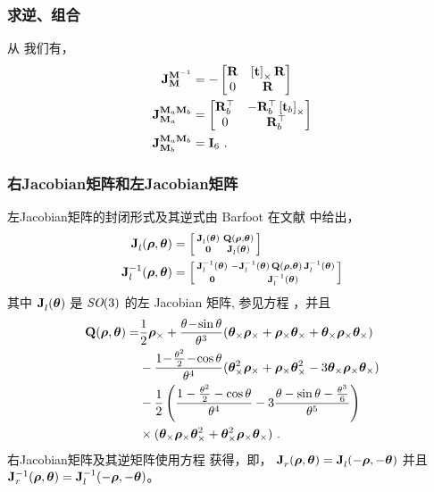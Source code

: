 \subsubsection{求逆、组合}

从  我们有，
%
\begin{align}
{{\bf J}^{{\bf M}^{-1}}_{{\bf M}}} &= - \begin{bmatrix}
  {\bf R} & \left[{\bf t}\right]_\times{\bf R} \\ 0 & {\bf R}
  \end{bmatrix} \\
{{\bf J}^{{\bf M}_a{\bf M}_b}_{{\bf M}_a}} &=   \begin{bmatrix}
  {\bf R}_b^{\top} & -{\bf R}_b^{\top}\left[{\bf t}_b\right]_\times \\ 0 & {\bf R}_b^{\top}
  \end{bmatrix} \\
{{\bf J}^{{\bf M}_a{\bf M}_b}_{{\bf M}_b}} &= {\bf I}_6  
~.
\end{align}

\subsubsection{右Jacobian矩阵和左Jacobian矩阵}

左Jacobian矩阵的封闭形式及其逆式由 Barfoot 在文献 \cite{BARFOOT-14} 中给出，
%
\begin{subequations}
\begin{align}
{{\bf J}^{}_{l}}({\bm \rho},{{\bm \theta}}) &= \begin{bsmallmatrix}
{{\bf J}^{}_{l}}({{\bm \theta}}) & {\bf Q}({\bm \rho},{{\bm \theta}}) \\
\bf0 & {{\bf J}^{}_{l}}({{\bm \theta}})
\end{bsmallmatrix}
\\
{{\bf J}^{-1}_{l}}({\bm \rho},{{\bm \theta}}) &= \begin{bsmallmatrix}
{{\bf J}^{-1}_{l}}({{\bm \theta}}) & -{{\bf J}^{-1}_{l}}({{\bm \theta}})\,{\bf Q}({\bm \rho},{{\bm \theta}})\,{{\bf J}^{-1}_{l}}({{\bm \theta}}) \\
\bf0 & {{\bf J}^{-1}_{l}}({{\bm \theta}})
\end{bsmallmatrix}
\end{align}
\end{subequations}
%
其中 ${{\bf J}^{}_{l}}({{\bm \theta}})$ 是 $\textit{SO}(3)$ 的左 Jacobian 矩阵, 参见方程  ，并且
%
\newcommand{\rhox}{\bfrho_\times}
\newcommand{\bthx}{\bth_\times}
%
\begin{align}
\bfQ(\bfrho,\bth) =& 
  \frac12\rhox 
  + \frac{\theta\!-\!\sin\theta}{\theta^3}(\bthx\rhox+\rhox\bthx+\bthx\rhox\bthx) 
  \notag\\
  &- \frac{1\! - \!\frac{\theta^2}{2}\! -\! \cos\theta}{\theta^4}(\bthx^2\rhox+\rhox\bthx^2-3\bthx\rhox\bthx)
  \notag\\
  &-\frac12\left(\frac{1 -  \frac{\theta^2}{2} - \cos\theta}{\theta^4} 
                  - 3\frac{\theta-\sin\theta-\frac{\theta^3}{6}}{\theta^5}\right)
  \notag\\
  &\times (\bthx\rhox\bthx^2 + \bthx^2\rhox\bthx)
~.
\end{align}
%
右Jacobian矩阵及其逆矩阵使用方程  获得，即， ${{\bf J}^{}_{r}}({\bm \rho},{{\bm \theta}})={{\bf J}^{}_{l}}(-{\bm \rho},-{{\bm \theta}})$ 并且 ${{\bf J}^{-1}_{r}}({\bm \rho},{{\bm \theta}})={{\bf J}^{-1}_{l}}(-{\bm \rho},-{{\bm \theta}})$。

